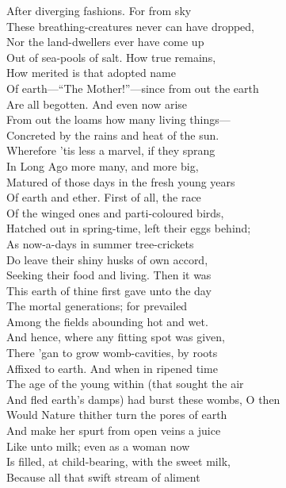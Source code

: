 After diverging fashions. For from sky\\
These breathing-creatures never can have dropped,\\
Nor the land-dwellers ever have come up\\
Out of sea-pools of salt. How true remains,\\
How merited is that adopted name\\
Of earth—``The Mother!''—since from out the earth\\
Are all begotten. And even now arise\\
From out the loams how many living things—\\
Concreted by the rains and heat of the sun.\\
Wherefore 'tis less a marvel, if they sprang\\
In Long Ago more many, and more big,\\
Matured of those days in the fresh young years\\
Of earth and ether. First of all, the race\\
Of the winged ones and parti-coloured birds,\\
Hatched out in spring-time, left their eggs behind;\\
As now-a-days in summer tree-crickets\\
Do leave their shiny husks of own accord,\\
Seeking their food and living. Then it was\\
This earth of thine first gave unto the day\\
The mortal generations; for prevailed\\
Among the fields abounding hot and wet.\\
And hence, where any fitting spot was given,\\
There 'gan to grow womb-cavities, by roots\\
Affixed to earth. And when in ripened time\\
The age of the young within (that sought the air\\
And fled earth's damps) had burst these wombs, O then\\
Would Nature thither turn the pores of earth\\
And make her spurt from open veins a juice\\
Like unto milk; even as a woman now\\
Is filled, at child-bearing, with the sweet milk,\\
Because all that swift stream of aliment\\

